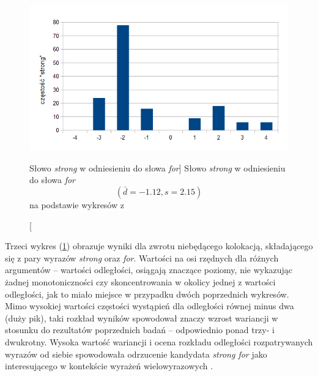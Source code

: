 \begin{figure}[h!]
\centering
\includegraphics{charts/manning_shutze_160_3}
\caption
	[Słowo \emph{strong} w odniesieniu do słowa \emph{for}]
	{
		Słowo \emph{strong} w odniesieniu do słowa \emph{for} 
		\begin{displaymath}
			(\bar{d} = -1.12, s = 2.15)
		\end{displaymath}	
		na podstawie wykresów z \cite[str. 160]{mit}
	}
\label{manning_shutze_160_3}
\end{figure}

\par
Trzeci wykres (\ref{manning_shutze_160_3}) obrazuje wyniki dla zwrotu niebędącego kolokacją, składającego się z pary wyrazów \emph{strong} oraz \emph{for}.
Wartości na osi rzędnych dla różnych argumentów -- wartości odległości, osiągają znaczące poziomy, nie wykazując żadnej monotoniczności czy skoncentrowania w okolicy jednej z wartości odległości, jak to miało miejsce w przypadku dwóch poprzednich wykresów.
Mimo wysokiej wartości częstości wystąpień dla odległości równej minus dwa (duży pik), taki rozkład wyników spowodował znaczy wzrost wariancji w stosunku do rezultatów poprzednich badań -- odpowiednio ponad trzy- i dwukrotny.
Wysoka wartość wariancji i ocena rozkładu odległości rozpatrywanych wyrazów od siebie spowodowała odrzucenie kandydata \emph{strong for} jako interesującego w kontekście wyrażeń wielowyrazowych \cite[str. 161]{mit}.

